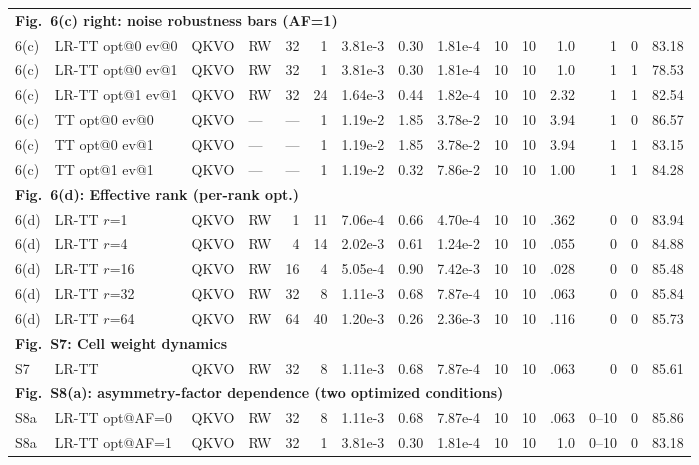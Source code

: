 \documentclass[fleqn,10pt]{wlscirep}
\begin{document}
{\begin{longtable}{@{}l l l l r r r r r r r r r r r@{}}
\multicolumn{15}{l}{\cellcolor{HeadGray}\textbf{Fig.~6(c) right: noise robustness bars (AF=1)}} \\
6(c) & LR-TT opt@0 ev@0 & QKVO & RW & 32 & 1 & 3.81e-3 & 0.30 & 1.81e-4 & 10 & 10 & 1.0 & 1 & 0 & 83.18 \\
6(c) & LR-TT opt@0 ev@1 & QKVO & RW & 32 & 1 & 3.81e-3 & 0.30 & 1.81e-4 & 10 & 10 & 1.0 & 1 & 1 & 78.53 \\
6(c) & LR-TT opt@1 ev@1 & QKVO & RW & 32 & 24 & 1.64e-3 & 0.44 & 1.82e-4 & 10 & 10 & 2.32 & 1 & 1 & 82.54 \\
6(c) & TT opt@0 ev@0 & QKVO & --- & --- & 1 & 1.19e-2 & 1.85 & 3.78e-2 & 10 & 10 & 3.94 & 1 & 0 & 86.57 \\
6(c) & TT opt@0 ev@1 & QKVO & --- & --- & 1 & 1.19e-2 & 1.85 & 3.78e-2 & 10 & 10 & 3.94 & 1 & 1 & 83.15 \\
6(c) & TT opt@1 ev@1 & QKVO & --- & --- & 1 & 1.19e-2 & 0.32 & 7.86e-2 & 10 & 10 & 1.00 & 1 & 1 & 84.28 \\
\midrule

\multicolumn{15}{l}{\cellcolor{HeadGray}\textbf{Fig.~6(d): Effective rank (per-rank opt.)}} \\
6(d) & LR-TT $r$=1 & QKVO & RW & 1 & 11 & 7.06e-4 & 0.66 & 4.70e-4 & 10 & 10 & .362 & 0 & 0 & 83.94 \\
6(d) & LR-TT $r$=4 & QKVO & RW & 4 & 14 & 2.02e-3 & 0.61 & 1.24e-2 & 10 & 10 & .055 & 0 & 0 & 84.88 \\
6(d) & LR-TT $r$=16 & QKVO & RW & 16 & 4 & 5.05e-4 & 0.90 & 7.42e-3 & 10 & 10 & .028 & 0 & 0 & 85.48 \\
6(d) & LR-TT $r$=32 & QKVO & RW & 32 & 8 & 1.11e-3 & 0.68 & 7.87e-4 & 10 & 10 & .063 & 0 & 0 & 85.84 \\
6(d) & LR-TT $r$=64 & QKVO & RW & 64 & 40 & 1.20e-3 & 0.26 & 2.36e-3 & 10 & 10 & .116 & 0 & 0 & 85.73 \\
\midrule

\multicolumn{15}{l}{\cellcolor{HeadGray}\textbf{Fig.~S7: Cell weight dynamics}} \\
S7 & LR-TT & QKVO & RW & 32 & 8 & 1.11e-3 & 0.68 & 7.87e-4 & 10 & 10 & .063 & 0 & 0 & 85.61 \\
\midrule

\multicolumn{15}{l}{\cellcolor{HeadGray}\textbf{Fig.~S8(a): asymmetry-factor dependence (two optimized conditions)}} \\
S8a & LR-TT opt@AF=0 & QKVO & RW & 32 & 8 & 1.11e-3 & 0.68 & 7.87e-4 & 10 & 10 & .063 & 0--10 & 0 & 85.86 \\
S8a & LR-TT opt@AF=1 & QKVO & RW & 32 & 1 & 3.81e-3 & 0.30 & 1.81e-4 & 10 & 10 & 1.0 & 0--10 & 0 & 83.18 \\
\midrule


\end{longtable}}
\end{document}
